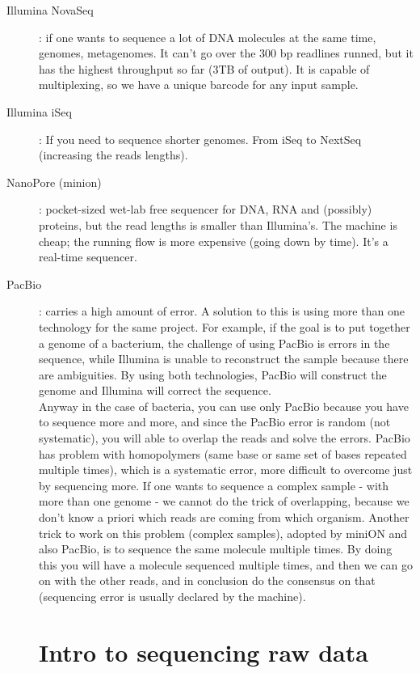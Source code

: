 \begin{description}
\item[Illumina NovaSeq]: if one wants to sequence a lot of DNA molecules at the same time, genomes, metagenomes. It can’t go over the 300 bp readlines runned, but it has the highest throughput so far (3TB of output). It is capable of multiplexing, so we have a unique barcode for any input sample. 
\item[Illumina iSeq]: If you need to sequence shorter genomes. From iSeq to NextSeq (increasing the reads lengths). 
\item[NanoPore (minion)]: pocket-sized wet-lab free sequencer for DNA, RNA and (possibly) proteins, but the read lengths is smaller than Illumina's. The machine is cheap; the running flow is more expensive (going down by time). It's a real-time sequencer. 
\item[PacBio]: carries a high amount of error. A solution to this is using more than one technology for the same project. For example, if the goal is to put together a genome of a bacterium, the challenge of using PacBio is errors in the sequence, while Illumina is unable to reconstruct the sample because there are ambiguities. By using both technologies, PacBio will construct the genome and Illumina will correct the sequence.\\
Anyway in the case of bacteria, you can use only PacBio because you have to sequence more and more, and since the PacBio error is random (not systematic), you will able to overlap the reads and solve the errors. PacBio has problem with homopolymers (same base or same set of bases repeated multiple times), which is a systematic error, more difficult to overcome just by sequencing more. If one wants to sequence a complex sample - with more than one genome - we cannot do the trick of overlapping, because we don’t know a priori which reads are coming from which organism. Another trick to work on this problem (complex samples), adopted by miniON and also PacBio, is to sequence the same molecule multiple times. By doing this you will have a molecule sequenced multiple times, and then we can go on with the other reads, and in conclusion do the consensus on that (sequencing error is usually declared by the machine). 

\section{Intro to sequencing raw data}


\end{description}
